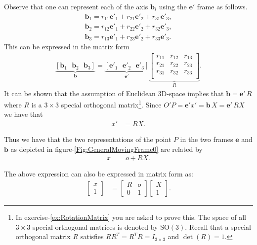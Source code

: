 \documentclass[graybox,envcountchap,sectrefs]{svmonoMuga}
\begin{document}
Observe that one can represent each of the axis $\mathbf{b}_i$ using the $\mathbf{e}'$ frame as follows.
\begin{align*}
\mathbf{b}_1= r_{11}\mathbf{e'}_1+r_{21}\mathbf{e'}_2+r_{31}\mathbf{e'}_3,\\
\mathbf{b}_2= r_{12}\mathbf{e'}_1+r_{22}\mathbf{e'}_2+r_{32}\mathbf{e'}_3,\\
\mathbf{b}_3= r_{13}\mathbf{e'}_1+r_{23}\mathbf{e'}_2+r_{33}\mathbf{e'}_3.
\end{align*}
This can be expressed in the matrix form
\begin{align*}
\underbrace{[\mathbf{b}_1\:\:\: \mathbf{b}_2\:\:\: \mathbf{b}_3]}_{\mathbf{b}}=\underbrace{[\mathbf{e'}_1\:\:\: \mathbf{e'}_2\:\:\: \mathbf{e'}_3]}_{\mathbf{e}'}\underbrace{\begin{bmatrix}r_{11}&r_{12}&r_{13}\\
r_{21}&r_{22}&r_{23}\\
r_{31}&r_{32}&r_{33}\\
\end{bmatrix}}_{R}.
\end{align*}
It can be shown that the assumption of Euclidean 3D-space implies that $\mathbf{b}=\mathbf{e}'\,R$ where $R$ is a $3\times 3$  special orthogonal matrix\footnote{In exercise-\ref{ex:RotationMatrix} you are asked to prove this. The space of all $3\times 3$ special orthogonal matrices is denoted by $\mathrm{SO}(3)$.
Recall that a special orthogonal matrix $R$ satisfies $RR^T=R^TR=I_{3\times 3}$ and $\det{(R)}=1$.}.
Since $O'P=\mathbf{e}'x'=\mathbf{b}\,X=\mathbf{e}'\,RX$ we have that 
\begin{align}
x'&=RX.\label{eq:RotatedFramesPosition}
\end{align}
\begin{svgraybox}
 Thus we have that the two 
representations of the point $P$ in the two frames $\mathbf{e}$ and $\mathbf{b}$ as depicted in figure-\ref{Fig:GeneralMovingFrame0} are related by
\begin{align}
x&=o+RX.\label{eq:Moving2FixedGeneral0}
\end{align}
\end{svgraybox}
The above expression can also be expressed in matrix form as:
\begin{align}
\left[\begin{array}{c}x \\ 1
\end{array}\right]&=\left[\begin{array}{cc}
R & o \\ 0 & 1\end{array}\right]
\left[\begin{array}{c} X \\ 1
\end{array}\right].
\end{align}
\end{document}
